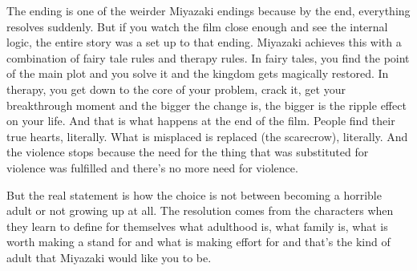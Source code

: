 \documentclass[11pt, letterpaper]{article}
\begin{document}
The ending is one of the weirder Miyazaki endings because by the end, everything resolves suddenly. But if you watch the film close enough and see the internal logic, the entire story was a set up to that ending. Miyazaki achieves this with a combination of fairy tale rules and therapy rules. In fairy tales, you find the point of the main plot and you solve it and the kingdom gets magically restored. In therapy, you get down to the core of your problem, crack it, get your breakthrough moment and the bigger the change is, the bigger is the ripple effect on your life. And that is what happens at the end of the film. People find their true hearts, literally. What is misplaced is replaced (the scarecrow), literally. And the violence stops because the need for the thing that was substituted for violence was fulfilled and there's no more need for violence. 

But the real statement is how the choice is not between becoming a horrible adult or not growing up at all. The resolution comes from the characters when they learn to define for themselves what adulthood is, what family is, what is worth making a stand for and what is making effort for and that's the kind of adult that Miyazaki would like you to be. 
\end{document}
